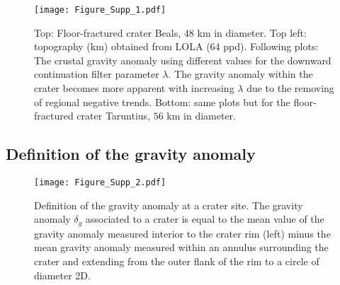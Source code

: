 \begin{figure}[h!]
  \begin{center}
    \texttt{[image: Figure\_Supp\_1.pdf]}
    \caption{Top: Floor-fractured  crater Beals, $48$ km  in diameter.
      Top  left:   topography  (km)  obtained  from   LOLA  (64  ppd).
      Following  plots: The  crustal gravity  anomaly using  different
      values for the downward continuation filter parameter $\lambda$.
      The gravity anomaly within the crater becomes more apparent with
      increasing $\lambda$  due to  the removing of  regional negative
      trends.  Bottom:  same plots but for  the floor-fractured crater
      Taruntius, $56$ km in diameter.}
    \label{Figure_Supp_1}
  \end{center}
\end{figure}

\subsection{Definition of the gravity anomaly}
\begin{figure}[h!]
  \begin{center}
    \texttt{[image: Figure\_Supp\_2.pdf]}
    \caption{Definition of the  gravity anomaly at a  crater site. The
      gravity anomaly  $\delta_g$ associated to  a crater is  equal to
      the mean value  of the gravity anomaly measured  interior to the
      crater rim (left) minus the mean gravity anomaly measured within
      an annulus surrounding  the crater and extending  from the outer
      flank of the rim to a circle of diameter 2D.}
    \label{Figure_Supp_2}
  \end{center}
\end{figure}


